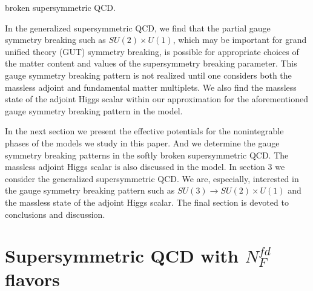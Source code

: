 \documentclass[a4paper,12pt]{article}
\begin{document}
broken supersymmetric QCD.
\par
In the generalized supersymmetric QCD, we 
find that the partial gauge symmetry breaking 
such as $SU(2)\times U(1)$, which may be important for grand unified 
theory (GUT) symmetry 
breaking, is possible
for appropriate choices of the matter content and values of
the supersymmetry breaking parameter.
This gauge symmetry breaking pattern is not realized until one
considers both the massless adjoint and fundamental matter multiplets.
We also find the massless state of
the adjoint Higgs scalar within our approximation 
for the aforementioned gauge symmetry breaking pattern in the model.
\par
In the next section we present the effective potentials for the
nonintegrable phases of the models we study in this paper. 
And we determine the gauge symmetry breaking patterns
in the softly broken supersymmetric QCD. The massless adjoint 
Higgs scalar is also 
discussed in the model.
In section $3$ we consider the 
generalized supersymmetric QCD.
We are, especially, interested in the gauge
symmetry breaking pattern such as $SU(3)\rightarrow SU(2)\times U(1)$ and the 
massless state of the adjoint Higgs scalar. 
The final section is devoted to conclusions and discussion.
\par
\section{Supersymmetric QCD with $N_F^{fd}$ flavors}
\end{document}
